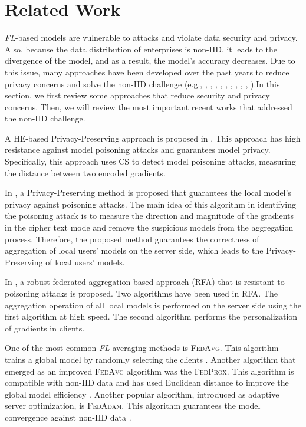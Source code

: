 \section{Related Work}
\label{RW1}
\emph{FL}-based models are vulnerable to attacks and violate data security and privacy. Also, because the data distribution of enterprises is non-IID, it leads to the divergence of the model, and as a result, the model's accuracy decreases. Due to this issue, many approaches have been developed over the past years to reduce privacy concerns and solve the non-IID challenge (e.g., \citep{ref2}, \citep{ref19}, \citep{ref20}, \citep{ref14}, \citep{ref10}, \citep{ref16}, \citep{ref35}, \citep{ref61}, \citep{ref62}, \citep{ref63}).In this section, we first review some approaches that reduce security and privacy concerns. Then, we will review the most important recent works that addressed the non-IID challenge.

A HE-based Privacy-Preserving approach is proposed in \citep{ref2}. This approach has high resistance against model poisoning attacks and guarantees model privacy. Specifically, this approach uses CS to detect model poisoning attacks, measuring the distance between two encoded gradients. 

In \citep{ref19}, a Privacy-Preserving method is proposed that guarantees the local model's privacy against poisoning attacks. The main idea of this algorithm in identifying the poisoning attack is to measure the direction and magnitude of the gradients in the cipher text mode and remove the suspicious models from the aggregation process. Therefore, the proposed method guarantees the correctness of aggregation of local users' models on the server side, which leads to the Privacy-Preserving of local users' models. 

In \citep{ref20}, a robust federated aggregation-based approach ({\textsc{RFA}}) that is resistant to poisoning attacks is proposed. Two algorithms have been used in {\textsc{RFA}}. The aggregation operation of all local models is performed on the server side using the first algorithm at high speed. The second algorithm performs the personalization of gradients in clients.

One of the most common \emph{FL} averaging methods is {\textsc{FedAvg}}. This algorithm trains a global model by randomly selecting the clients \citep{ref14}. Another algorithm that emerged as an improved {\textsc{FedAvg}} algorithm was the {\textsc{FedProx}}. This algorithm is compatible with non-IID data and has used Euclidean distance to improve the global model efficiency \citep{ref10}. Another popular algorithm, introduced as adaptive server optimization, is {\textsc{FedAdam}}. This algorithm guarantees the model convergence against non-IID data \citep{ref16}.

